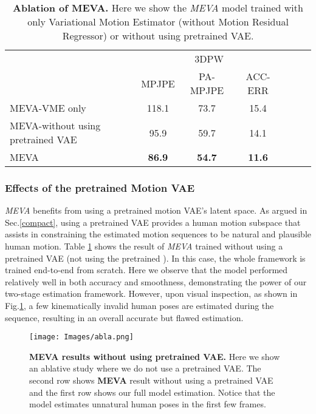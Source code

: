 \documentclass[runningheads]{llncs}
\begin{document}
\begin{table}[!thb]
\caption{\textbf{Ablation of MEVA.} Here we show the \textit{MEVA} model trained with only Variational Motion Estimator (without Motion Residual Regressor) or without using pretrained VAE. } \label{t:motion_hl_abla} 
\centering
\resizebox{3 in}{!} {
\begin{tabular}{l|c|c|c|c|c|r}
\hline
\multicolumn{1}{c|}{\multirow{2}{*}{}} & \multicolumn{3}{c|}{3DPW } \\ \cline{2-4} 
\multicolumn{1}{c|}{} & MPJPE  & PA-MPJPE  &  ACC-ERR  \\ \hline
    MEVA-VME only   & 118.1 & 73.7 & 15.4 \\ \hline
    MEVA-without using pretrained VAE   & 95.9 & 59.7 & 14.1 \\ \hline
     MEVA   & \textbf{86.9} & \textbf{54.7} & \textbf{11.6}  \\
     \hline
\end{tabular}}
\end{table}

\subsubsection{Effects of the pretrained Motion VAE}
\label{abla_pretrained_vae}
\textit{MEVA} benefits from using a pretrained motion VAE's latent space. As argued in Sec.\ref{compact}, using a pretrained VAE provides a human motion subspace that assists in constraining the estimated motion sequences to be natural and plausible human motion. Table \ref{t:motion_hl_abla} shows the result of \textit{MEVA} trained without using a pretrained VAE (not using the pretrained ). In this case, the whole framework is trained end-to-end from scratch. Here we observe that the model performed relatively well in both accuracy and smoothness, demonstrating the power of our two-stage estimation framework. However, upon visual inspection, as shown in Fig.\ref{fig:abla}, a few kinematically invalid human poses are estimated during the sequence, resulting in an overall accurate but flawed estimation. 


\begin{figure}[t]
    \centering
    \texttt{[image: Images/abla.png]}
    \caption{\textbf{\textbf{MEVA} results without using pretrained VAE.} Here we show an ablative study where we do not use a pretrained VAE. The second row shows \textbf{MEVA} result without using a pretrained VAE and the first row shows our full model estimation. Notice that the model estimates unnatural human poses in the first few frames. }
    \label{fig:abla}
\end{figure}
\end{document}
